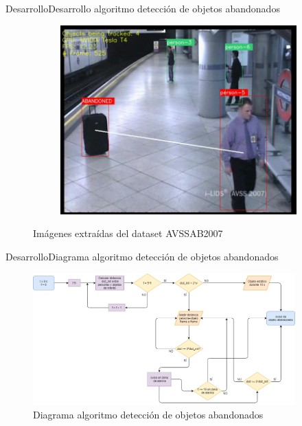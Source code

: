 \begin{frame}{Desarrollo}{Desarrollo algoritmo detección de objetos abandonados}
\begin{figure}[ht]
\begin{subfigure}[b]{0.28\textwidth}
    \includegraphics[width=\textwidth]{Images/desarrollo/abandono-objeto-avss.jpg}
    \caption{}
    \label{fig:avss2007_abandoned}
  \end{subfigure}
  \caption{Imágenes extraídas del dataset AVSSAB2007}
  \label{fig:asociacion-warning-abandoned}
\end{figure}
    
\end{frame}


\begin{frame}{Desarrollo}{Diagrama algoritmo detección de objetos abandonados}

\begin{figure}
	\centering
	\includegraphics[width=0.9\textwidth]{Images/desarrollo/abandoned-object-scheme.png}
    \caption{Diagrama algoritmo detección de objetos abandonados}
\end{figure}

\end{frame}


